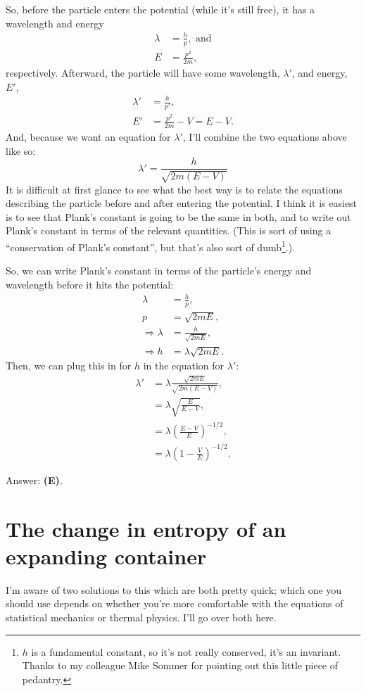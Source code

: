 \documentclass[11pt]{paper}
\newcommand{\answer}[1]{Answer: \textbf{(#1)}.}
\begin{document}
So, before the particle enters the potential (while it's still free), it has a wavelength and energy
\begin{align}
\lambda &= \frac{h}{p}, \text{ and}\\
E &= \frac{p^2}{2m},
\end{align}
respectively.  Afterward, the particle will have some wavelength, $\lambda'$, and energy, $E'$,
\begin{align}
\lambda' &= \frac{h}{p'},\\
E' &= \frac{p^2}{2m} - V = E - V.
\end{align}
And, because we want an equation for $\lambda'$, I'll combine the two equations above like so:
\begin{equation}
\lambda' = \frac{h}{\sqrt{2m(E-V)}}
\end{equation}
It is difficult at first glance to see what the best way is to relate the equations describing the particle before and after entering the potential.  I think it is easiest is to see that Plank's constant is going to be the same in both, and to write out Plank's constant in terms of the relevant quantities.  (This is sort of using a ``conservation of Plank's constant'', but that's also sort of dumb\footnote{$h$ is a fundamental constant, so it's not really conserved, it's an invariant. Thanks to my colleague Mike Sommer for pointing out this little piece of pedantry.}.).

So, we can write Plank's constant in terms of the particle's energy and wavelength before it hits the potential:
\begin{align}
\lambda &= \frac{h}{p},\\
p &= \sqrt{2mE},\\
\Rightarrow \lambda &= \frac{h}{\sqrt{2mE}},\\
\Rightarrow h &= \lambda\sqrt{2mE}.
\end{align}
Then, we can plug this in for $h$ in the equation for $\lambda'$:
\begin{align}
\lambda' &= \lambda \frac{\sqrt{2mE}}{\sqrt{2m(E-V)}},\\
&= \lambda \sqrt{\frac{E}{E-V}},\\
&= \lambda \left(\frac{E-V}{E}\right)^{-1/2},\\
&= \lambda \left(1-\frac{V}{E}\right)^{-1/2}.
\end{align}

\answer{E}
\section{The change in entropy of an expanding container}
I'm aware of two solutions to this which are both pretty quick; which one you should use depends on whether you're more comfortable with the equations of statistical mechanics or thermal physics.  I'll go over both here.
\end{document}

